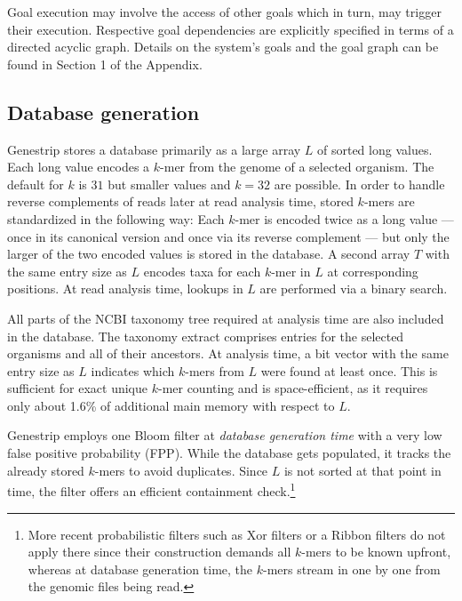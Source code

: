 \documentclass[pdflatex,sn-vancouver-num]{sn-jnl}
\begin{document}
    Goal execution may involve the access of other goals which in turn, may trigger their execution. Respective goal dependencies are explicitly specified in terms of a directed acyclic graph. Details on the system's goals and the goal graph can be found in Section 1
    of the Appendix.

    \subsection{Database generation}
    \label{database}

    Genestrip stores a database primarily as a large array $L$ of sorted long values. Each long value encodes a $k$-mer from the genome of a selected organism. The default for $k$ is $31$ but smaller values and $k=32$ are possible.
    In order to handle reverse complements of reads later at read analysis time, stored $k$-mers are standardized in the following way: Each $k$-mer is encoded twice as a long value --- once in its canonical version and once via its reverse complement --- but only the larger of the two encoded values is stored in the database. A second array $T$ with the same entry size as $L$ encodes taxa for each $k$-mer in $L$ at corresponding positions. At read analysis time, lookups in $L$ are performed via a binary search.

    All parts of the NCBI taxonomy tree \citep{taxonomy} required at analysis time are also included in  the database. The taxonomy extract comprises entries for the selected organisms and all of their ancestors. At analysis time, a bit vector with the same entry size as $L$ indicates which $k$-mers from $L$ were found at least once. This is sufficient for exact unique $k$-mer counting and is space-efficient, as it requires only about 1.6\% of additional main memory with respect to $L$.

     Genestrip employs one Bloom filter \citep{bloomfilter} at \emph{database generation time} with a very low false positive probability (FPP). While the database gets populated, it tracks the already stored $k$-mers to avoid duplicates. Since $L$ is not sorted at that point in time, the filter offers an efficient containment check.\footnote{More recent probabilistic filters such as Xor filters \citep{10.1145/3376122} or a Ribbon filters \citep{9920402} do not apply there since their construction demands all $k$-mers to be known upfront, whereas at database generation time, the $k$-mers stream in one by one from the genomic files being read.}
\end{document}
